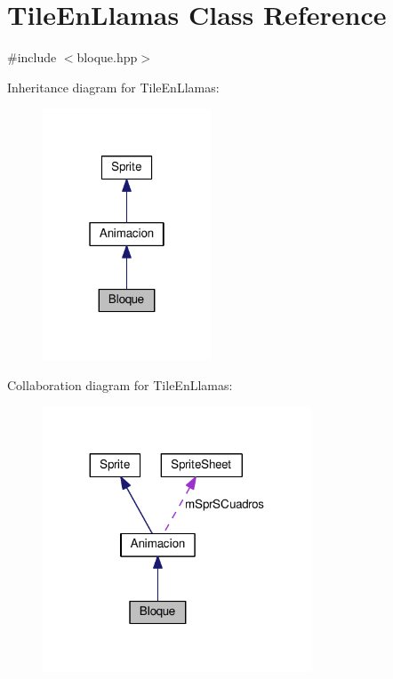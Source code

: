 \hypertarget{class_bloque}{}\section{TileEnLlamas Class Reference}
\label{class_bloque}


{\ttfamily \#include $<$bloque.\+hpp$>$}



Inheritance diagram for TileEnLlamas\+:
\nopagebreak
\begin{figure}[H]
\begin{center}
\leavevmode
\includegraphics[width=142pt]{class_bloque__inherit__graph}
\end{center}
\end{figure}


Collaboration diagram for TileEnLlamas\+:
\nopagebreak
\begin{figure}[H]
\begin{center}
\leavevmode
\includegraphics[width=227pt]{class_bloque__coll__graph}
\end{center}
\end{figure}
